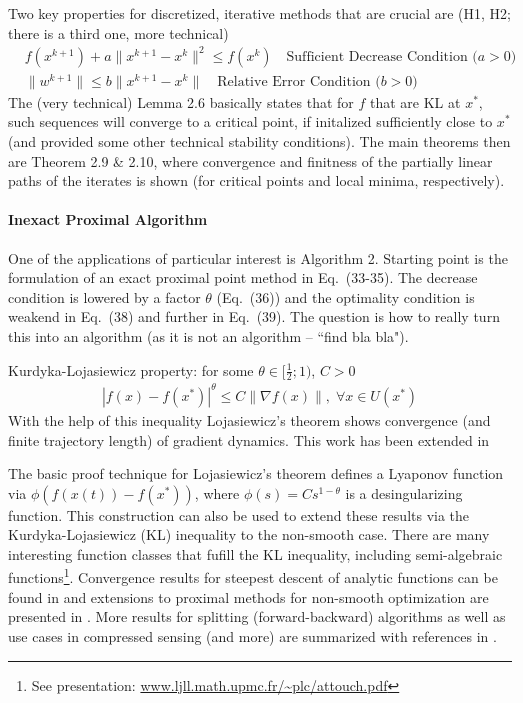 \documentclass{article}
\begin{document}
Two key properties for discretized, iterative methods that are crucial are (H1, H2; there is a third one, more technical)
\begin{align}
& f(x^{k+1}) + a \|  x^{k+1} - x^k \|^2 \le f(x^k) \quad \text{Sufficient Decrease Condition ($a>0$)}\\
& \| w^{k+1}\| \le b \|  x^{k+1} - x^k \| \quad \text{Relative Error Condition ($b>0$)}
\end{align}
The (very technical) Lemma 2.6 basically states that for $f$ that are KL at $x^*$, such sequences will converge to a critical point, if initalized sufficiently close to $x^*$ (and provided some other technical stability conditions). The main theorems then are Theorem 2.9 \& 2.10, where convergence and finitness of the partially linear  paths of the iterates is shown (for critical points and local minima, respectively).

\paragraph{Inexact Proximal Algorithm}

One of the applications of particular interest is Algorithm 2. Starting point is the formulation of an exact proximal point method in Eq.~(33-35). The decrease condition is lowered by a factor $\theta$ (Eq.~(36)) and the optimality condition is weakend in Eq.~(38) and further in Eq.~(39). The question is how to really turn this into an algorithm (as it is not an algorithm -- ``find bla bla").

\newpage


\noindent 
Kurdyka-Lojasiewicz property: for some $\theta \in [\tfrac 12; 1)$, $C>0$
\begin{align}
| f(x) - f(x^*) |^\theta \le C \| \nabla f(x) \|, \; \forall x \in U(x^*)
\end{align}
With the help of this inequality Lojasiewicz's theorem \cite{Lojasiewicz84} shows convergence (and finite trajectory length) of gradient dynamics.  This work has been extended in \cite{kurdyka2000proof} 

The basic proof technique for Lojasiewicz's theorem defines a Lyaponov function via $\phi(f(x(t))-f(x^*))$, where $\phi(s) = Cs^{1-\theta}$ is a desingularizing function. This construction can also be used \cite{kurdyka1998gradients} to extend these results via the Kurdyka-Lojasiewicz (KL) inequality \cite{attouch2010proximal} to the non-smooth case. There are many interesting function classes that fufill the KL inequality, including semi-algebraic functions\footnote{See presentation: \url{www.ljll.math.upmc.fr/~plc/attouch.pdf}}. Convergence results for steepest descent of analytic functions can be found in \cite{absil2005convergence} and extensions to proximal methods for non-smooth optimization are presented in \cite{attouch2009convergence,attouch2011prox}. More results for splitting (forward-backward) algorithms as well as use cases in compressed sensing (and more) are summarized with references in \cite{attouch2011Poincare}.
\end{document}
